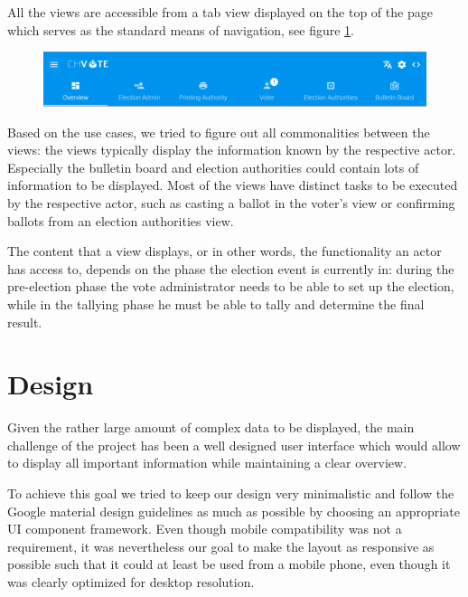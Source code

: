 All the views are accessible from a tab view displayed on the top of the page which serves as the standard means of navigation, see figure \ref{Navigation}.

\begin{figure}[p]
\begin{center}
\includegraphics[scale=0.44]{assets/screenshots/navigation.png}
\label{Navigation}%
\end{center}
\end{figure}

Based on the use cases, we tried to figure out all commonalities between the views: the views typically display the information known by the respective actor. Especially the bulletin board and election authorities could contain lots of information to be displayed. Most of the views have distinct tasks to be executed by the respective actor, such as casting a ballot in the voter's view or confirming ballots from an election authorities view.

The content that a view displays, or in other words, the functionality an actor has access to, depends on the phase the election event is currently in: during the pre-election phase the vote administrator needs to be able to set up the election, while in the tallying phase he must be able to tally and determine the final result.


\section{Design}
Given the rather large amount of complex data to be displayed, the main challenge of the project has been a well designed user interface which would allow to display all important information while maintaining a clear overview.

To achieve this goal we tried to keep our design very minimalistic and follow the Google material design guidelines as much as possible by choosing an appropriate UI component framework. Even though mobile compatibility was not a requirement, it was nevertheless our goal to make the layout as responsive as possible such that it could at least be used from a mobile phone, even though it was clearly optimized for desktop resolution.

